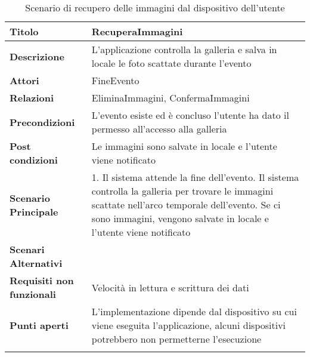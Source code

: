 \begin{longtable} {|P{4.5cm}|P{11cm}|}
        \hline
        \textbf{Titolo}                   & RecuperaImmagini                                                                                                                           \\
        \hline
        \textbf{Descrizione}              & L'applicazione controlla la galleria e salva in locale le foto scattate durante l'evento                                                   \\
        \hline
        \textbf{Attori}                   & FineEvento                                                                                                                                 \\
        \hline
        \textbf{Relazioni}                & EliminaImmagini, ConfermaImmagini                                                                                                          \\
        \hline
        \textbf{Precondizioni}            & L'evento esiste ed è concluso\newline
        l'utente ha dato il permesso all'accesso alla galleria                                                                                                                         \\
        \hline
        \textbf{Post condizioni}           & Le immagini sono salvate in locale e l'utente viene notificato                                                                             \\
        \hline
        \textbf{Scenario Principale}      & 1. Il sistema attende la fine dell'evento. Il sistema controlla la galleria per trovare le immagini scattate nell'arco temporale dell'evento. Se ci sono immagini, vengono salvate in locale e l'utente viene notificato                                                                                                  \\
        \hline
        \textbf{Scenari Alternativi}      &                                                                                                                                            \\
        \hline
        \textbf{Requisiti non funzionali} & Velocità in lettura e scrittura dei dati                                                                                                   \\
        \hline
        \textbf{Punti aperti}             & L'implementazione dipende dal dispositivo su cui viene eseguita l'applicazione, alcuni dispositivi potrebbero non permetterne l'esecuzione \\
        \hline


    \caption{Scenario di recupero delle immagini dal dispositivo dell'utente}
\end{longtable}

